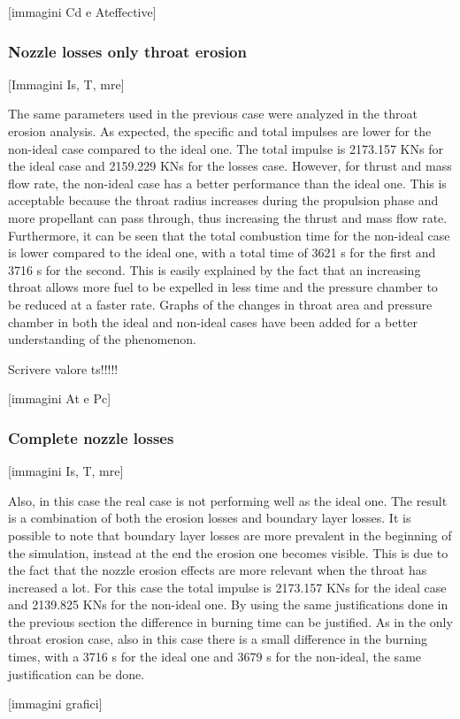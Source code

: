 [immagini Cd e Ateffective]  
     
\subsubsection{Nozzle losses only throat erosion} 

[Immagini Is, T, mre]      

The same parameters used in the previous case were analyzed in the throat erosion analysis. As expected, the specific and total impulses are lower for the non-ideal case compared to the ideal one. The total impulse is 2173.157 KNs for the ideal case and 2159.229 KNs for the losses case. However, for thrust and mass flow rate, the non-ideal case has a better performance than the ideal one. This is acceptable because the throat radius increases during the propulsion phase and more propellant can pass through, thus increasing the thrust and mass flow rate. Furthermore, it can be seen that the total combustion time for the non-ideal case is lower compared to the ideal one, with a total time of 3621 s for the first and 3716 s for the second. This is easily explained by the fact that an increasing throat allows more fuel to be expelled in less time and the pressure chamber to be reduced at a faster rate. Graphs of the changes in throat area and pressure chamber in both the ideal and non-ideal cases have been added for a better understanding of the phenomenon. 

Scrivere valore ts!!!!! 

[immagini At e Pc]

\subsubsection{Complete nozzle losses}  

[immagini Is, T, mre]   

Also, in this case the real case is not performing well as the ideal one. The result is a combination of both the erosion losses and boundary layer losses. It is possible to note that boundary layer losses are more prevalent in the beginning of the simulation, instead at the end the erosion one becomes visible. This is due to the fact that the nozzle erosion effects are more relevant when the throat has increased a lot. For this case the total impulse is 2173.157 KNs for the ideal case and 2139.825 KNs for the non-ideal one. By using the same justifications done in the previous section the difference in burning time can be justified. As in the only throat erosion case, also in this case there is a small difference in the burning times, with a 3716 s for the ideal one and 3679 s for the non-ideal, the same justification can be done. 

[immagini grafici]       